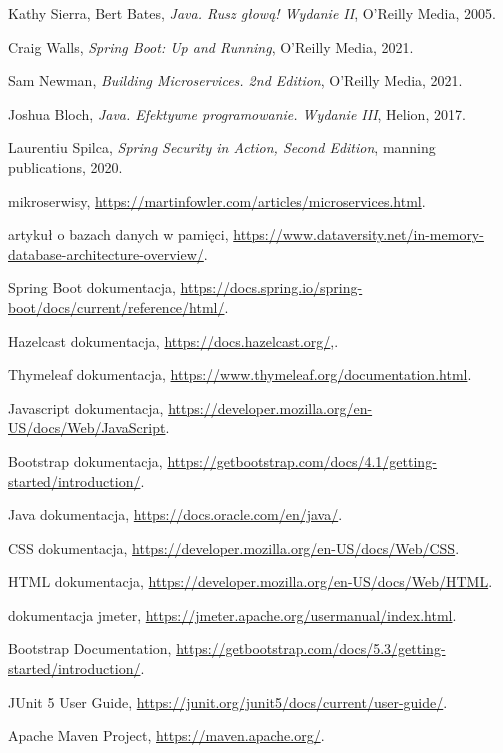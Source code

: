 \begin{thebibliography}{99}

Kathy Sierra, Bert Bates,
\textit{Java. Rusz głową! Wydanie II},
O'Reilly Media, 2005.

Craig Walls,
\textit{Spring Boot: Up and Running},
O'Reilly Media, 2021.

Sam Newman,
\textit{Building Microservices. 2nd Edition},
O'Reilly Media, 2021.

Joshua Bloch,
\textit{Java. Efektywne programowanie. Wydanie III},
Helion, 2017.

Laurentiu Spilca,
\textit{Spring Security in Action, Second Edition},
manning publications, 2020.


mikroserwisy,
\url{https://martinfowler.com/articles/microservices.html}.

artykuł o bazach danych w pamięci,
\url{https://www.dataversity.net/in-memory-database-architecture-overview/}.

Spring Boot dokumentacja,
\url{https://docs.spring.io/spring-boot/docs/current/reference/html/}.

Hazelcast dokumentacja,
\url{https://docs.hazelcast.org/},.

Thymeleaf dokumentacja,
\url{https://www.thymeleaf.org/documentation.html}.

Javascript dokumentacja,
\url{https://developer.mozilla.org/en-US/docs/Web/JavaScript}.

Bootstrap dokumentacja,
\url{https://getbootstrap.com/docs/4.1/getting-started/introduction/}.

Java dokumentacja,
\url{https://docs.oracle.com/en/java/}.

CSS dokumentacja,
\url{https://developer.mozilla.org/en-US/docs/Web/CSS}.

HTML dokumentacja,
\url{https://developer.mozilla.org/en-US/docs/Web/HTML}.

dokumentacja jmeter,
\url{https://jmeter.apache.org/usermanual/index.html}.


Bootstrap Documentation,
\url{https://getbootstrap.com/docs/5.3/getting-started/introduction/}.

JUnit 5 User Guide,
\url{https://junit.org/junit5/docs/current/user-guide/}.

Apache Maven Project,
\url{https://maven.apache.org/}.

\end{thebibliography}